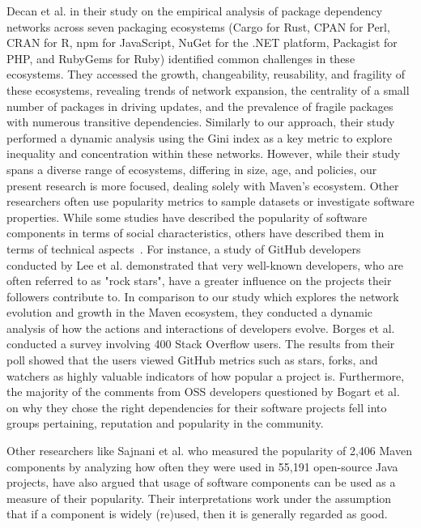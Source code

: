 \documentclass[10pt,conference]{IEEEtran}
\begin{document}
Decan et al. \cite{decan2019empirical} in their study on the empirical analysis of package dependency networks across seven packaging ecosystems (Cargo for Rust, CPAN for Perl, CRAN for R, npm for JavaScript, NuGet for the .NET platform, Packagist for PHP, and RubyGems for Ruby) identified common challenges in these ecosystems. They accessed the growth, changeability, reusability, and fragility of these ecosystems, revealing trends of network expansion, the centrality of a small number of packages in driving updates, and the prevalence of fragile packages with numerous transitive dependencies. Similarly to our approach, their study performed a dynamic analysis using the Gini index as a key metric to explore inequality and concentration within these networks. However, while their study spans a diverse range of ecosystems, differing in size, age, and policies, our present research is more focused, dealing solely with Maven's ecosystem.
Other researchers often use popularity metrics to sample datasets or investigate software properties. While some studies have described the popularity of software components in terms of social characteristics, others have described them in terms of technical aspects~\cite{Zerouali2014}. For instance, a study of GitHub developers conducted by Lee et al. \cite{lee2013github} demonstrated that very well-known developers, who are often referred to as "rock stars", have a greater influence on the projects their followers contribute to. In comparison to our study which explores the network evolution and growth in the Maven ecosystem, they conducted a dynamic analysis of how the actions and interactions of developers evolve.
Borges et al. \cite{borges2018s} conducted a survey involving 400 Stack Overflow users. The results from their poll showed that the users viewed GitHub metrics such as stars, forks, and watchers as highly valuable indicators of how popular a project is. Furthermore, the majority of the comments from OSS developers questioned by Bogart et al. \cite{bogart2016break} on why they chose the right dependencies for their software projects fell into groups pertaining, reputation and popularity in the community. 

Other researchers like Sajnani et al. \cite{sajnani2014popularity} who measured the popularity of 2,406 Maven components by analyzing how often they were used in 55,191 open-source Java projects, have also argued that usage of software components can be used as a measure of their popularity. Their interpretations work under the assumption that if a component is widely (re)used, then it is generally regarded as good.
\end{document}
